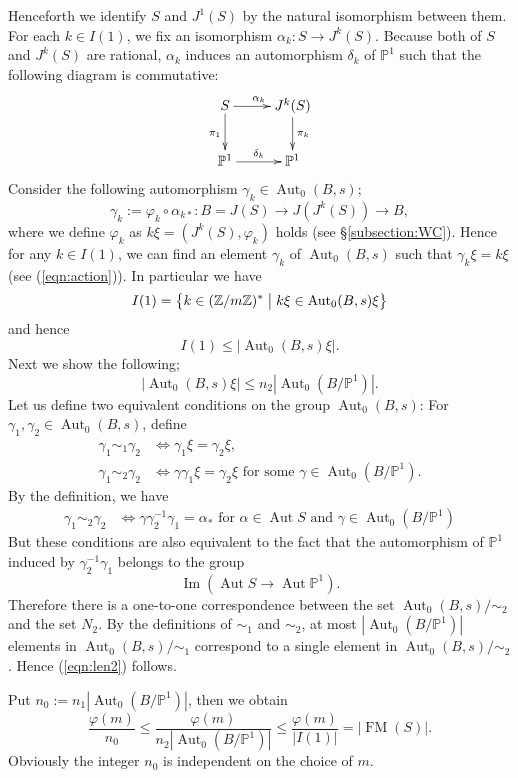 \documentclass[a4paper,11pt]{article}
\theoremstyle{definition}\newtheorem{defn}[thm]{Definition}
\theoremstyle{remark}\newtheorem{remark}[thm]{Remark}
\numberwithin{equation}{section}
\newcommand{\Aut}{\ensuremath{\operatorname{Aut}}}
\newcommand{\Image}{\ensuremath{\operatorname{Im}}}
\newcommand{\FM}{\operatorname{FM}}
\newcommand{\PP}{\mathbb P}
\newcommand{\Z}{\mathbb Z}
\begin{document}
Henceforth we identify $S$ and $J^1(S)$ by the natural isomorphism between 
them. 
For each $k\in I(1)$, we fix an isomorphism $\alpha_k:S \to J^k(S)$. 
Because both of $S$ and $J^k(S)$ are rational,
$\alpha_k$ induces an automorphism $\delta_k$ of 
$\PP^1$ such that the following diagram is commutative:
%
%
\noindent
\[ \xymatrix{ S \ar[d]_{\pi_1} \ar[r]^{\alpha_k}& J^k (S) \ar[d]^{\pi_k} \\  \PP ^1 \ar[r] ^{\delta_k} & \PP ^1}\]
%
%
Consider the following automorphism $\gamma_k\in \Aut_0(B,s)$; 
$$
\gamma_k:=\varphi_k\circ\alpha _{k *}\colon 
B= J(S)\to  J(J^k (S))\to B,
$$
where we define $\varphi_k$ as $k\xi=(J^k(S),\varphi_k)$ holds 
(see \S \ref{subsection:WC}).
Hence for any $k\in I(1)$,
we can find an element $\gamma_k$ of $\Aut _0(B,s)$ 
such that $\gamma_k\xi=k\xi$ (see (\ref{eqn:action})). In particular
we have
\begin{equation}\label{eq:I(1)}
I(1)=\bigl\{ 
k\in  (\Z/m\Z)^*  \bigm|
k\xi \in \Aut _0(B,s)\xi
\bigr\}
\end{equation} 
%
and hence
$$
I(1)\le |\Aut _0(B,s)\xi|.
$$ 
Next we show the following;
%
\begin{equation}\label{eqn:len2}
|\Aut _0(B,s)\xi|\le n_2|\Aut _0(B/\PP ^1)|.
\end{equation}
%
Let us define two equivalent conditions on the group $\Aut_0(B,s)$:
For $\gamma_1,\gamma_2\in \Aut_0(B,s)$, define
%
\begin{align*}
\gamma_1 \sim _1 \gamma_2 &\iff \gamma_1\xi=\gamma_2\xi,\\
\gamma_1 \sim _2 \gamma_2 &\iff \gamma\gamma_1\xi=\gamma_2\xi
\mbox{ for some } \gamma \in \Aut_0(B/\PP ^1). 
\end{align*}
%
By the definition, we have 
%
\begin{align*}
\gamma_1\sim_2\gamma_2
&\iff
\gamma \gamma_2^{-1}\gamma_1= \alpha_*
\mbox{ for } \alpha \in \Aut S \mbox{ and }
\gamma \in \Aut_0(B/\PP ^1)
\end{align*}
But these conditions are also equivalent to the fact that
the automorphism of 
$\PP ^1$ induced by 
$\gamma_2^{-1}\gamma_1$ belongs to
the group 
$$
\Image (\Aut S\to \Aut \PP ^1).
$$
Therefore there is a one-to-one correspondence between
the set $\Aut _0(B,s)/\sim_2$ and the set $N_2$.
By the definitions of $\sim_1$ and $\sim_2$,
 at most $|\Aut_0 (B/\PP^1)|$ elements in  $\Aut _0(B,s)/\sim_1$
correspond to a single element in  $\Aut _0(B,s)/\sim_2$. 
Hence (\ref{eqn:len2}) follows.  

Put $n_0:=n_1|\Aut _0(B/\PP ^1)|$, 
then we obtain 
$$
\frac{\varphi(m)}{n_0}\le
\frac{\varphi(m)}{n_2|\Aut _0(B/\PP ^1)|}\le
\frac{\varphi(m)}{|I(1)|}=|\FM(S)|.
$$ 
Obviously the integer $n_0$ is independent on the choice of $m$.
\end{document}
